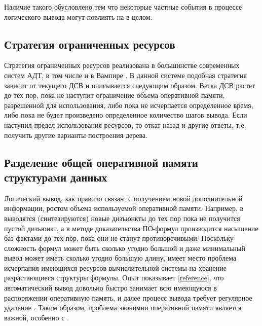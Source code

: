 Наличие такого  обусловлено тем что некоторые частные события в процессе логического вывода могут повлиять на  в целом.

\subsection{Стратегия ограниченных ресурсов}
Стратегия ограниченных ресурсов реализована в большинстве современных систем АДТ, в том числе и в Вампире \cite{}. В данной системе подобная стратегия  зависит от текущего ДСВ и описывается следующим образом. Ветка ДСВ растет до тех пор, пока не наступит ограничение объема оперативной памяти, разрешенной для использования, либо пока не исчерпается определенное время, либо пока не будет произведено определенное количество шагов вывода. Если наступил предел использования ресурсов, то  откат назад и  другие ответы, т.е. получить другие варианты построения дерева.

\subsection{Разделение общей оперативной памяти структурами данных}
Логический вывод, как правило связан, с получением новой дополнительной информации, ростом объема используемой оперативной памяти. Например, в  выводятся (синтезируются) новые дизъюнкты до тех пор пока не получится пустой дизъюнкт, а в методе доказательства ПО-формул производится насыщение баз фактами до тех пор, пока они не станут противоречивыми. Поскольку сложность формул может быть сколько угодно большой и даже минимальный вывод может иметь сколько угодно большую длину, имеет место проблема исчерпания имеющихся ресурсов вычислительной системы на хранение разрастающиеся структуры формулы. Опыт показывает \ref{reference}, что автоматический вывод довольно быстро занимает всю имеющуюся в распоряжении оперативную память, и далее процесс вывода требует регулярное удаление . Таким образом, проблема экономии оперативной памяти является важной, особенно с .

